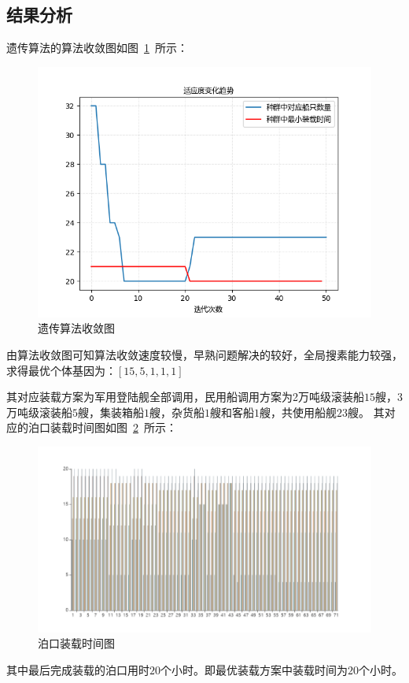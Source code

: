 \documentclass{whutmod}
\begin{document}
     	\subsection{结果分析}
     	遗传算法的算法收敛图如图~\ref{sdsd}~所示：
     	    \begin{figure}[H]
     		\centering
     		\includegraphics[width=.7\textwidth]{figures/shou1.png}
     		\caption{遗传算法收敛图}\label{sdsd}
     	\end{figure}
     	
     	由算法收敛图可知算法收敛速度较慢，早熟问题解决的较好，全局搜素能力较强，求得最优个体基因为：$[15,5,1,1,1]$
     	
     	其对应装载方案为军用登陆舰全部调用，民用船调用方案为2万吨级滚装船$15$艘，3万吨级滚装船$5$艘，集装箱船$1$艘，杂货船$1$艘和客船$1$艘，共使用船舰$23$艘。
     	其对应的泊口装载时间图如图~\ref{sbsb}~所示：
     	\begin{figure}[H]
     		\centering
     		\includegraphics[width=\textwidth]{figures/bo1.png}
     		\caption{泊口装载时间图}\label{sbsb}
     	\end{figure}
     	
     	其中最后完成装载的泊口用时$20$个小时。即最优装载方案中装载时间为$20$个小时。
     	
\end{document}
